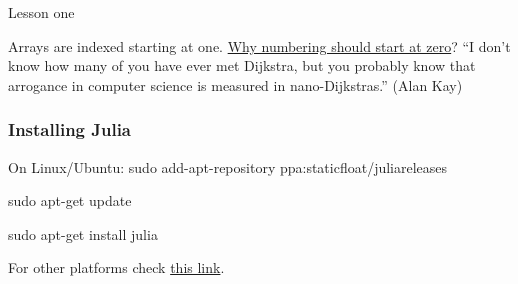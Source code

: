\documentclass{beamer}
\begin{document}
\begin{frame}{Lesson one}

  Arrays are indexed starting at one.
  \pause
  \vfill
  \href{https://www.cs.utexas.edu/users/EWD/transcriptions/EWD08xx/EWD831.html}{Why numbering should start at zero}?
  \pause
  ``I don't know how many of you have ever met Dijkstra, but you probably know that arrogance in computer science is measured in nano-Dijkstras.'' (Alan Kay)
\end{frame}

\begin{frame}
  \frametitle{Installing Julia}

  \begin{block}{On Linux/Ubuntu:}
  sudo add-apt-repository ppa:staticfloat/juliareleases

  sudo apt-get update

  sudo apt-get install julia  
  \end{block}
  \vspace{2cm}
  For other platforms check \href{http://julialang.org/downloads/platform.html}{this link}.
\end{frame}


\end{document}
